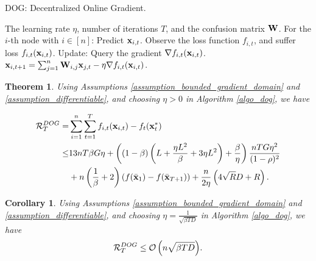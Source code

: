 \documentclass{article}
\newtheorem{Theorem}{\bf{Theorem}}
\newtheorem{Corollary}{\bf{Corollary}}
\begin{document}
\newcommand\StateX{\Statex\hspace{\algorithmicindent}}
\begin{algorithm}[!]
   \caption{DOG: Decentralized Online Gradient.}
   \label{algo_dog}
   \begin{algorithmic}[1]
   \Require The learning rate $\eta$, number of iterations $T$, and the confusion matrix ${\bf W}$.
           \StateX For the $i$-th node with $i\in[n]$:
            \State \indent Predict ${\bf x}_{i,t}$.
            \State \indent Observe the loss function $f_{i,t}$,
            \StateX \indent and suffer loss $f_{i,t}({\bf x}_{i,t})$.
            \StateX Update:
            \State \indent Query the gradient $\nabla f_{i,t}({\bf x}_{i,t})$.  
            \State \indent ${\bf x}_{i,t+1} = \sum_{j=1}^n {\bf W}_{i,j}{\bf x}_{j,t} - \eta \nabla f_{i,t}({\bf x}_{i,t})$. 
       \EndFor
   \end{algorithmic}
\end{algorithm}










\begin{Theorem}
\label{theorem_regret_upper_bound}
Using Assumptions \ref{assumption_bounded_gradient_domain} and \ref{assumption_differentiable}, and choosing $\eta>0$ in Algorithm \ref{algo_dog}, we have

\begin{align}
\nonumber
{\mathcal{R}}_T^{DOG} = & \sum_{i=1}^n\sum_{t=1}^T f_{i,t}({\bf x}_{i,t}) - f_t({\bf x}_t^\ast) \\ \nonumber
\le & 13nT\beta G \eta + \left(  (1-\beta)  \left(  L + \frac{\eta L^2}{\beta} + 3\eta L^2  \right) + \frac{\beta}{\eta}  \right) \frac{nT G \eta^2}{(1-\rho)^2} \\ \nonumber 
&+ n\left( \frac{1}{\beta} + 2 \right)\left( f(\bar{{\bf x}}_1) - f(\bar{{\bf x}}_{T+1}) \right)   + \frac{n}{2\eta}\left(  4\sqrt{R}D + R   \right).
\end{align}


\end{Theorem}


\begin{Corollary}
Using Assumptions \ref{assumption_bounded_gradient_domain} and \ref{assumption_differentiable}, and choosing $\eta = \frac{1}{\sqrt{\beta TD}}$ in Algorithm \ref{algo_dog}, we have
\begin{align}
\nonumber
{\mathcal{R}}_T^{DOG} \le {\mathcal{O}\left( n\sqrt{\beta TD} \right)}.
\end{align}




\end{Corollary}
\end{document}
